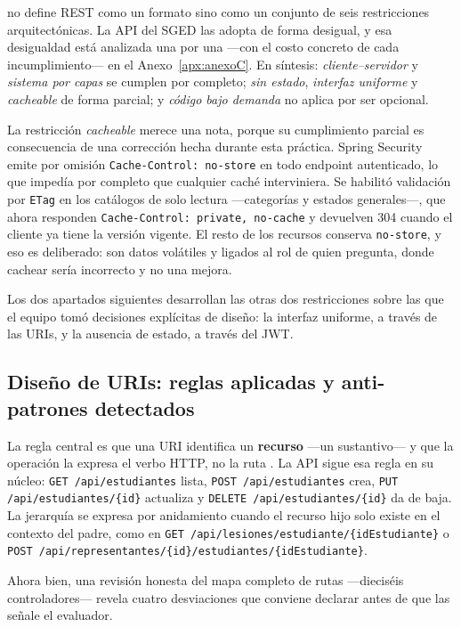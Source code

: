 \documentclass[12pt,a4paper]{article}
\begin{document}
\textcite{fielding2000} no define REST como un formato sino como un conjunto de seis
restricciones arquitectónicas. La API del SGED las adopta de forma desigual, y esa desigualdad
está analizada una por una ---con el costo concreto de cada incumplimiento--- en el
Anexo~\ref{apx:anexoC}. En síntesis: \textit{cliente--servidor} y \textit{sistema por capas} se
cumplen por completo; \textit{sin estado}, \textit{interfaz uniforme} y \textit{cacheable} de
forma parcial; y \textit{código bajo demanda} no aplica por ser opcional.

La restricción \textit{cacheable} merece una nota, porque su cumplimiento parcial es
consecuencia de una corrección hecha durante esta práctica. Spring Security emite por omisión
\texttt{Cache-Control: no-store} en todo endpoint autenticado, lo que impedía por completo que
cualquier caché interviniera. Se habilitó validación por \texttt{ETag} en los catálogos de solo
lectura ---categorías y estados generales---, que ahora responden
\texttt{Cache-Control: private, no-cache} y devuelven 304 cuando el cliente ya tiene la versión
vigente. El resto de los recursos conserva \texttt{no-store}, y eso es deliberado: son datos
volátiles y ligados al rol de quien pregunta, donde cachear sería incorrecto y no una mejora.

Los dos apartados siguientes desarrollan las otras dos restricciones sobre las que el equipo
tomó decisiones explícitas de diseño: la interfaz uniforme, a través de las URIs, y la ausencia
de estado, a través del JWT.

\subsection{Diseño de URIs: reglas aplicadas y anti-patrones detectados}

La regla central es que una URI identifica un \textbf{recurso} ---un sustantivo--- y que la
operación la expresa el verbo HTTP, no la ruta \parencite{masse2011}. La API sigue esa regla en
su núcleo: \texttt{GET /api/estudiantes} lista, \texttt{POST /api/estudiantes} crea,
\texttt{PUT /api/estudiantes/\{id\}} actualiza y \texttt{DELETE /api/estudiantes/\{id\}} da de
baja. La jerarquía se expresa por anidamiento cuando el recurso hijo solo existe en el contexto
del padre, como en \texttt{GET /api/lesiones/estudiante/\{idEstudiante\}} o
\texttt{POST /api/representantes/\{id\}/estudiantes/\{idEstudiante\}}.

Ahora bien, una revisión honesta del mapa completo de rutas ---dieciséis controladores---
revela cuatro desviaciones que conviene declarar antes de que las señale el evaluador.
\end{document}
